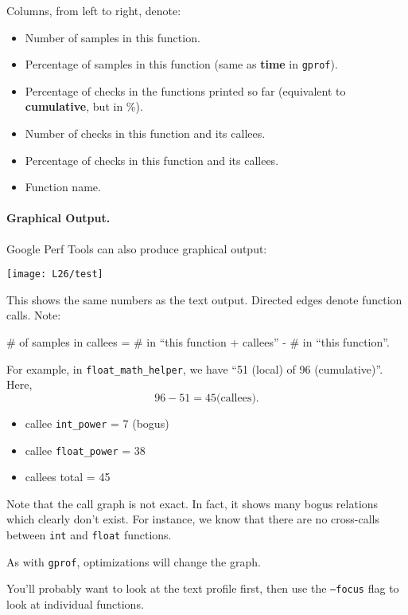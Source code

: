 Columns, from left to right, denote:
\begin{itemize}
\item  Number of samples in this function.
\item  Percentage of samples in this function (same as {\bf time} in {\tt gprof}).
\item  Percentage of checks in the functions printed so far (equivalent to {\bf cumulative}, but in \%).
\item     Number of checks in this function and its callees.
\item     Percentage of checks in this function and its callees.
\item    Function name.
\end{itemize}

\paragraph{Graphical Output.} Google Perf Tools can also produce graphical output:

\begin{center}
    \texttt{[image: L26/test]}
\end{center}

This shows the same numbers as the text output. Directed edges denote function calls.
Note: 
\begin{center}
\# of samples in callees = \# in ``this function + callees'' - \# in ``this function''.
\end{center}

For example, in {\tt float\_math\_helper}, we have ``51 (local) of 96 (cumulative)''.
Here,
\[ 96 - 51 = 45 \mbox{(callees)}. \]
      \begin{itemize}
        \item callee {\tt int\_power} = 7 (bogus)
        \item callee {\tt float\_power} = 38
        \item callees total = 45
      \end{itemize}

Note that the call graph is not exact.
In fact, it shows many bogus relations which clearly don't exist.
For instance, we know that there are no cross-calls between {\tt int} and {\tt float} functions.

As with {\tt gprof}, optimizations will change the
      graph.\

You'll probably want to look at the text profile first, then use the
      {\tt --focus} flag to look at individual functions.

